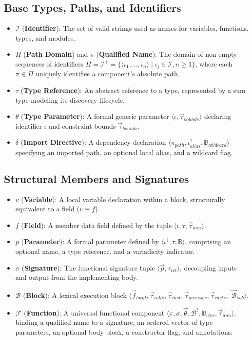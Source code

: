 \subsection{Base Types, Paths, and Identifiers}
\begin{itemize}
  \item $\mathcal{I}$ (\textbf{Identifier}): The set of valid strings
    used as names for variables, functions, types, and modules.
  \item $\Pi$ (\textbf{Path Domain}) and $\pi$ (\textbf{Qualified Name}):
    The domain of non-empty sequences of identifiers $\Pi = \mathcal{I}^+ =
    \{ \langle \iota_1, \dots, \iota_n \rangle \mid \iota_j \in
    \mathcal{I}, n \ge 1 \}$,
    where each $\pi \in \Pi$ uniquely identifies a component's absolute path.
  \item $\tau$ (\textbf{Type Reference}): An abstract reference to a type,
    represented by a sum type modeling its discovery lifecycle.
  \item $\theta$ (\textbf{Type Parameter}): A formal generic parameter
    $\langle \iota, \vec{\tau}_{bounds} \rangle$ declaring identifier $\iota$
    and constraint bounds $\vec{\tau}_{bounds}$.
  \item $\delta$ (\textbf{Import Directive}): A dependency declaration
    $\langle \pi_{path}, \iota_{alias}^?, \mathbb{B}_{wildcard} \rangle$
    specifying an imported path, an optional local alias, and a wildcard flag.
\end{itemize}

\subsection{Structural Members and Signatures}
\begin{itemize}
  \item $v$ (\textbf{Variable}): A local variable declaration within a block,
    structurally equivalent to a field ($v \equiv f$).
  \item $f$ (\textbf{Field}): A member data field defined by the tuple
    $\langle \iota, \tau, \vec{\tau}_{ann} \rangle$.
  \item $p$ (\textbf{Parameter}): A formal parameter defined by
    $\langle \iota^?, \tau, \mathbb{B} \rangle$, comprising an optional
    name, a type reference, and a variadicity indicator.
  \item $\sigma$ (\textbf{Signature}): The functional signature tuple
    $\langle \vec{p}, \tau_{ret} \rangle$, decoupling inputs and output
    from the implementing body.
  \item $\mathcal{B}$ (\textbf{Block}): A lexical execution block
    $\langle \vec{f}_{local}, \vec{\tau}_{calls}, \vec{\tau}_{inst},
    \vec{\tau}_{accesses}, \vec{\tau}_{casts},$
    $\vec{\mathcal{B}}_{sub} \rangle$.
  \item $\mathcal{F}$ (\textbf{Function}): A universal functional component
    $\langle \pi, \sigma, \vec{\theta}, \mathcal{B}^?,
    \mathbb{B}_{ctor}, \vec{\tau}_{ann} \rangle$,
    binding a qualified name to a signature, an ordered vector of
    type parameters,
    an optional body block, a constructor flag, and annotations.
\end{itemize}

